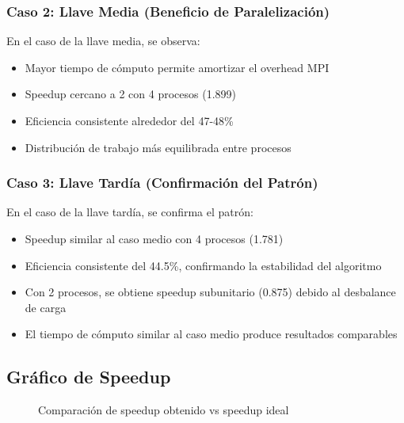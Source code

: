 \documentclass[12pt,letterpaper]{article}
\begin{document}
\subsubsection{Caso 2: Llave Media (Beneficio de Paralelización)}

En el caso de la llave media, se observa:
\begin{itemize}
    \item Mayor tiempo de cómputo permite amortizar el overhead MPI
    \item Speedup cercano a 2 con 4 procesos (1.899)
    \item Eficiencia consistente alrededor del 47-48\%
    \item Distribución de trabajo más equilibrada entre procesos
\end{itemize}

\subsubsection{Caso 3: Llave Tardía (Confirmación del Patrón)}

En el caso de la llave tardía, se confirma el patrón:
\begin{itemize}
    \item Speedup similar al caso medio con 4 procesos (1.781)
    \item Eficiencia consistente del 44.5\%, confirmando la estabilidad del algoritmo
    \item Con 2 procesos, se obtiene speedup subunitario (0.875) debido al desbalance de carga
    \item El tiempo de cómputo similar al caso medio produce resultados comparables
\end{itemize}

\subsection{Gráfico de Speedup}

\begin{figure}[H]
\centering
{}
\caption{Comparación de speedup obtenido vs speedup ideal}
\label{fig:speedup}
\end{figure}
\end{document}
